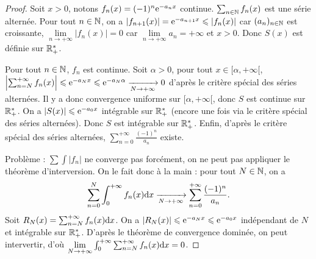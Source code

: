 \documentclass[12pt]{article}
\begin{document}
\begin{proof}
    Soit $x>0$, notons $f_n(x)=(-1)^{n}\mathrm{e}^{-a_n x}$ continue. $\sum_{n\in\mathbb{N}}f_n(x)$ est une série alternée. Pour tout $n\in\mathbb{N}$, on a $\left\lvert f_{n+1}(x)\right\rvert=\mathrm{e}^{-a_{n+1} x}\leqslant\left\lvert f_n(x)\right\rvert$ car $(a_n)_{n\in\mathbb{N}}$ est croissante, $\lim\limits_{n\to+\infty}\left\lvert f_n(x)\right\rvert=0$ car $\lim\limits_{n\to+\infty}a_n=+\infty$ et $x>0$. Donc $S(x)$ est définie sur $\mathbb{R}_{+}^{*}$.

    Pour tout $n\in\mathbb{N}$, $f_n$ est continue. Soit $\alpha>0$, pour tout $x\in[\alpha,+\infty[$, $\left\lvert\sum_{n=N}^{+\infty}f_n(x)\right\rvert\leqslant\mathrm{e}^{-a_{N}x}\leqslant\mathrm{e}^{-a_N \alpha}\xrightarrow[N\to+\infty]{}0$ d'après le critère spécial des séries alternées. Il y a donc convergence uniforme sur $[\alpha,+\infty[$, donc $S$ est continue sur $\mathbb{R}_{+}^{*}$. On a $\left\lvert S(x)\right\rvert\leqslant\mathrm{e}^{-a_0 x}$ intégrable sur $\mathbb{R}_{+}^{*}$ (encore une fois via le critère spécial des séries alternées). Donc $S$ est intégrable sur $\mathbb{R}_{+}^{*}$. Enfin, d'après le critère spécial des séries alternées, $\sum_{n=0}^{+\infty}\frac{(-1)^{n}}{a_n}$ existe.

    Problème : $\sum\int\left\lvert f_n\right\rvert$ ne converge pas forcément, on ne peut pas appliquer le théorème d'interversion.
    On le fait donc à la main : pour tout $N\in\mathbb{N}$, on a 
    \begin{equation}
        \sum_{n=0}^{N}\int_{0}^{+\infty}f_n(x)\mathrm{d} x\xrightarrow[N\to+\infty]{}\sum_{n=0}^{+\infty}\frac{(-1)^{n}}{a_n}.
    \end{equation}
    Soit $R_N(x)=\sum_{n=N}^{+\infty}f_n(x)\mathrm{d} x$. On a $\left\lvert R_N(x)\right\rvert\leqslant\mathrm{e}^{-a_N x}\leqslant \mathrm{e}^{-a_0 x}$ indépendant de $N$ et intégrable sur $\mathbb{R}_{+}^{*}$. D'après le théorème de convergence dominée, on peut intervertir, d'où $\lim\limits_{N\to+\infty}\int_{0}^{+\infty}\sum_{n=N}^{+\infty}f_n(x)\mathrm{d} x=0$.
\end{proof}
\end{document}
